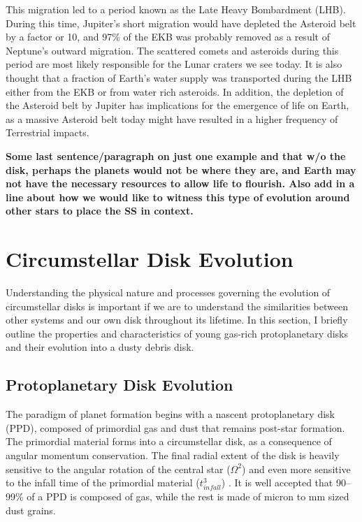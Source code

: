     This migration led to a period known as the Late Heavy Bombardment (LHB). During this time, Jupiter's short migration would have depleted the Asteroid belt by a factor or 10, and 97\% of the EKB was probably removed as a result of Neptune's outward migration. The scattered comets and asteroids during this period are most likely responsible for the Lunar craters we see today\citep{Gomes2005}. It is also thought that a fraction of Earth's water supply was transported during the LHB either from the EKB or from water rich asteroids. In addition, the depletion of the Asteroid belt by Jupiter has implications for the emergence of life on Earth, as a massive Asteroid belt today might have resulted in a higher frequency of Terrestrial impacts. 
    
    \textbf{Some last sentence/paragraph on just one example and that w/o the disk, perhaps the planets would not be where they are, and Earth may not have the necessary resources to allow life to flourish. Also add in a line about how we would like to witness this type of evolution around other stars to place the SS in context.}
    

\section{Circumstellar Disk Evolution}
    
    Understanding the physical nature and processes governing the evolution of circumstellar disks is important if we are to understand the similarities between other systems and our own disk throughout its lifetime. In this section, I briefly outline the properties and characteristics of young gas-rich protoplanetary disks and their evolution into a dusty debris disk.

    \subsection{Protoplanetary Disk Evolution}
    
    The paradigm of planet formation begins with a nascent protoplanetary disk (PPD), composed of primordial gas and dust that remains post-star formation. The primordial material forms into a circumstellar disk, as a consequence of angular momentum conservation. The final radial extent of the disk is heavily sensitive to the angular rotation of the central star ($\Omega^2$) and even more sensitive to the infall time of the primordial material ($t_{infall}^3$) \citep{Terebey1984}. It is well accepted that 90--99\% of a PPD is composed of gas, while the rest is made of micron to mm sized dust grains.
    
